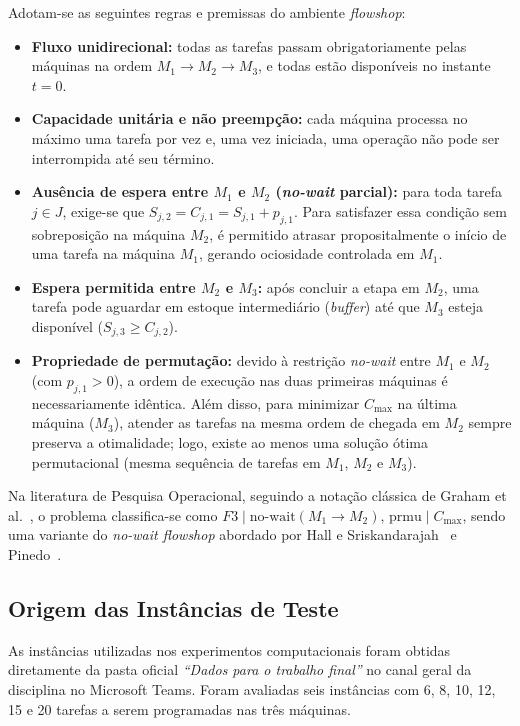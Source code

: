 \documentclass[11pt,a4paper]{article}
\begin{document}
Adotam-se as seguintes regras e premissas do ambiente \textit{flowshop}:
\begin{itemize}
    \item \textbf{Fluxo unidirecional:} todas as tarefas passam obrigatoriamente pelas máquinas na ordem $M_1 \to M_2 \to M_3$, e todas estão disponíveis no instante $t = 0$.
    \item \textbf{Capacidade unitária e não preempção:} cada máquina processa no máximo uma tarefa por vez e, uma vez iniciada, uma operação não pode ser interrompida até seu término.
    \item \textbf{Ausência de espera entre $M_1$ e $M_2$ (\textit{no-wait} parcial):} para toda tarefa $j \in J$, exige-se que $S_{j,2} = C_{j,1} = S_{j,1} + p_{j,1}$. Para satisfazer essa condição sem sobreposição na máquina $M_2$, é permitido atrasar propositalmente o início de uma tarefa na máquina $M_1$, gerando ociosidade controlada em $M_1$.
    \item \textbf{Espera permitida entre $M_2$ e $M_3$:} após concluir a etapa em $M_2$, uma tarefa pode aguardar em estoque intermediário (\textit{buffer}) até que $M_3$ esteja disponível ($S_{j,3} \ge C_{j,2}$).
    \item \textbf{Propriedade de permutação:} devido à restrição \textit{no-wait} entre $M_1$ e $M_2$ (com $p_{j,1} > 0$), a ordem de execução nas duas primeiras máquinas é necessariamente idêntica. Além disso, para minimizar $C_{\max}$ na última máquina ($M_3$), atender as tarefas na mesma ordem de chegada em $M_2$ sempre preserva a otimalidade; logo, existe ao menos uma solução ótima permutacional (mesma sequência de tarefas em $M_1$, $M_2$ e $M_3$).
\end{itemize}

Na literatura de Pesquisa Operacional, seguindo a notação clássica de Graham et al.~\cite{graham1979}, o problema classifica-se como $F3 \mid \text{no-wait}(M_1 \to M_2),\, \text{prmu} \mid C_{\max}$, sendo uma variante do \textit{no-wait flowshop} abordado por Hall e Sriskandarajah~\cite{hall1996} e Pinedo~\cite{pinedo2016}.

\subsection{Origem das Instâncias de Teste}
As instâncias utilizadas nos experimentos computacionais foram obtidas diretamente da pasta oficial \textit{``Dados para o trabalho final''} no canal geral da disciplina no Microsoft Teams. Foram avaliadas seis instâncias com 6, 8, 10, 12, 15 e 20 tarefas a serem programadas nas três máquinas.
\end{document}
